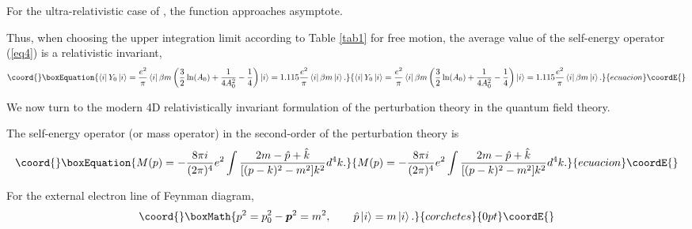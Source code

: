 \documentclass[a4paper,draft,showpacs,preprint,prd,aps]{revtex4}
\begin{document}
For the ultra-relativistic case of \coordHE{}, the function approaches
\coordHE{} asymptote.

Thus, when choosing the upper integration limit \coordHE{} according
to Table \ref{tab1} for free motion, the average
value of the self-energy operator (\ref{eq4}) is a relativistic invariant,
\begin{equation}\coord{}\boxEquation{
\label{eq11}
\left\langle i\right|Y_0 \left| i \right\rangle =
\frac {e^2}\pi
\left\langle i \right| \beta m \left( \frac 32\ln(A_0) +
\frac 1{4A_0^2} - \frac 14\right)
\left| i \right\rangle = 1.115\frac{e^2}\pi
\left\langle i \right|\beta m\left| i \right\rangle.
}{
\left\langle i\right|Y_0 \left| i \right\rangle =
\frac {e^2}\pi
\left\langle i \right| \beta m \left( \frac 32\ln(A_0) +
\frac 1{4A_0^2} - \frac 14\right)
\left| i \right\rangle = 1.115\frac{e^2}\pi
\left\langle i \right|\beta m\left| i \right\rangle.
}{ecuacion}\coordE{}\end{equation}



We now turn to the modern 4D relativistically invariant formulation of the
perturbation theory in the quantum field theory.

The self-energy operator (or mass operator) in the second-order of the
perturbation theory is
\begin{equation}\coord{}\boxEquation{
\label{eq12}
M(p) = - \frac{8\pi i}{(2\pi)^4}e^2
\int \frac{2m - \hat{p} + \hat{k}}{[(p-k)^2 - m^2] k^2}d^4k.
}{
M(p) = - \frac{8\pi i}{(2\pi)^4}e^2
\int \frac{2m - \hat{p} + \hat{k}}{[(p-k)^2 - m^2] k^2}d^4k.
}{ecuacion}\coordE{}\end{equation}

For the external electron line of Feynman diagram,
\[\coord{}\boxMath{
p^2 = p_0^2 -\bm{p}^2 = m^2,\quad \quad \hat{p}\left| i \right\rangle =
m\left| i \right\rangle.
}{corchetes}{0pt}\coordE{}\]
\end{document}
